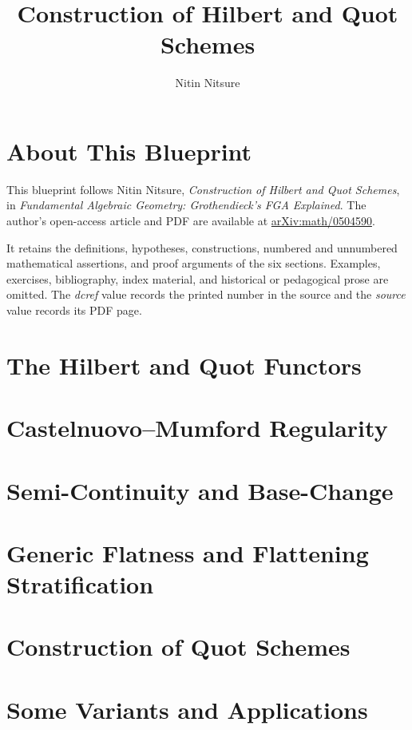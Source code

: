 \documentclass[11pt]{report}
\title{Construction of Hilbert and Quot Schemes}
\author{Nitin Nitsure}
\begin{document}
\maketitle
\chapter*{About This Blueprint}
This blueprint follows Nitin Nitsure, \emph{Construction of Hilbert and Quot
Schemes}, in \emph{Fundamental Algebraic Geometry: Grothendieck's FGA
Explained}.  The author's open-access article and PDF are available at
\href{https://arxiv.org/abs/math/0504590}{arXiv:math/0504590}.

It retains the definitions, hypotheses, constructions, numbered and unnumbered
mathematical assertions, and proof arguments of the six sections.  Examples,
exercises, bibliography, index material, and historical or pedagogical prose are
omitted.  The \emph{dcref} value records the printed number in the source and
the \emph{source} value records its PDF page.

\tableofcontents
\chapter{The Hilbert and Quot Functors}

\chapter{Castelnuovo--Mumford Regularity}

\chapter{Semi-Continuity and Base-Change}

\chapter{Generic Flatness and Flattening Stratification}

\chapter{Construction of Quot Schemes}

\chapter{Some Variants and Applications}

\end{document}
